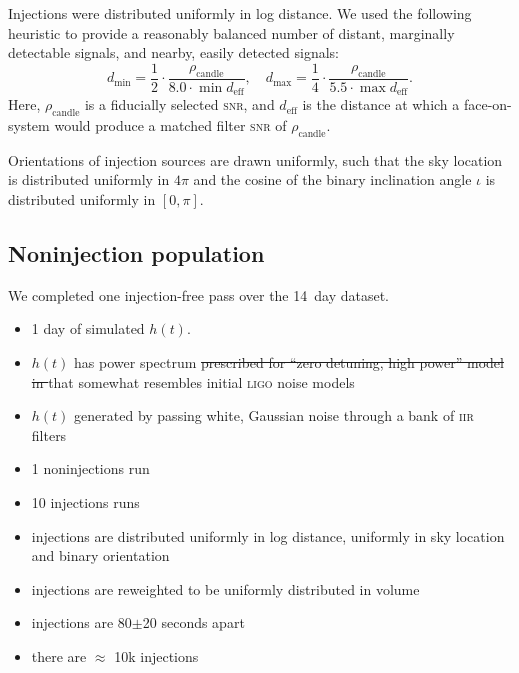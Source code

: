 Injections were distributed uniformly in log distance.  We used the following heuristic to provide a reasonably balanced number of distant, marginally detectable signals, and nearby, easily detected signals:
$$
d_\mathrm{min} = \frac{1}{2} \cdot \frac{\rho_\mathrm{candle}}{8.0 \cdot \min {d_\mathrm{eff}}}, \quad
d_\mathrm{max} = \frac{1}{4} \cdot \frac{\rho_\mathrm{candle}}{5.5 \cdot \max {d_\mathrm{eff}}}.
$$
Here, $\rho_\mathrm{candle}$ is a fiducially selected \textsc{snr}, and $d_\mathrm{eff}$ is the distance at which a face-on-system would produce a matched filter \textsc{snr} of $\rho_\mathrm{candle}$.

Orientations of injection sources are drawn uniformly, such that the sky location is distributed uniformly in $4\pi$ and the cosine of the binary inclination angle $\iota$ is distributed uniformly in $[0, \pi]$.

\subsection{Noninjection population}

We completed one injection-free pass over the 14~day dataset. 

\begin{itemize}
\item 1 day of simulated $h(t)$.
\item $h(t)$ has power spectrum \sout{prescribed for ``zero detuning, high power'' model in \cite{Shoemaker:2009p9770}} that somewhat resembles initial \textsc{ligo} noise models
\item $h(t)$ generated by passing white, Gaussian noise through a bank of \textsc{iir} filters
\item 1 noninjections run
\item 10 injections runs
\item injections are distributed uniformly in log distance, uniformly in sky location and binary orientation
\item injections are reweighted to be uniformly distributed in volume
\item injections are 80$\pm$20 seconds apart
\item there are $\approx$ 10k injections
\end{itemize}

